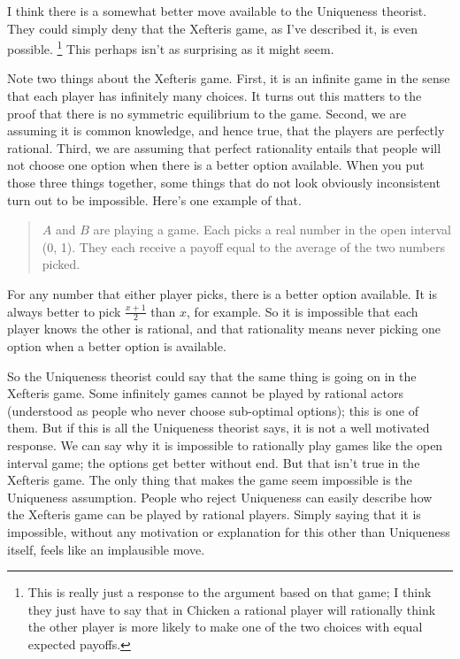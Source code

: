 \documentclass[
  11pt,
]{article}
\begin{document}
I think there is a somewhat better move available to the Uniqueness theorist. They could simply deny that the Xefteris game, as I've described it, is even possible. \footnote{This is really just a response to the argument based on that game; I think they just have to say that in Chicken a rational player will rationally think the other player is more likely to make one of the two choices with equal expected payoffs.} This perhaps isn't as surprising as it might seem.

Note two things about the Xefteris game. First, it is an infinite game in the sense that each player has infinitely many choices. It turns out this matters to the proof that there is no symmetric equilibrium to the game. Second, we are assuming it is common knowledge, and hence true, that the players are perfectly rational. Third, we are assuming that perfect rationality entails that people will not choose one option when there is a better option available. When you put those three things together, some things that do not look obviously inconsistent turn out to be impossible. Here's one example of that.

\begin{quote}
\(A\) and \(B\) are playing a game. Each picks a real number in the open interval (0, 1). They each receive a payoff equal to the average of the two numbers picked.
\end{quote}

For any number that either player picks, there is a better option available. It is always better to pick \(\frac{x+1}{2}\) than \(x\), for example. So it is impossible that each player knows the other is rational, and that rationality means never picking one option when a better option is available.

So the Uniqueness theorist could say that the same thing is going on in the Xefteris game. Some infinitely games cannot be played by rational actors (understood as people who never choose sub-optimal options); this is one of them. But if this is all the Uniqueness theorist says, it is not a well motivated response. We can say why it is impossible to rationally play games like the open interval game; the options get better without end. But that isn't true in the Xefteris game. The only thing that makes the game seem impossible is the Uniqueness assumption. People who reject Uniqueness can easily describe how the Xefteris game can be played by rational players. Simply saying that it is impossible, without any motivation or explanation for this other than Uniqueness itself, feels like an implausible move.
\end{document}
